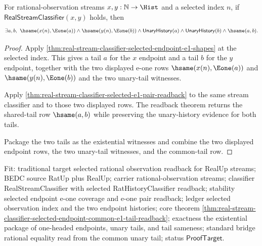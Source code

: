 \begin{theorem}
\label{thm:real-stream-classifier-selected-endpoint-common-e1-tail-readback}
For rational-observation streams $x,y:\mathbb{N}\to\Hist$ and a selected
index $n$, if $\mathsf{RealStreamClassifier}(x,y)$ holds, then
$$
\exists a,b,\ \hsame(x(n),\Eone(a))\land\hsame(y(n),\Eone(b))\land
\mathsf{UnaryHistory}(a)\land\mathsf{UnaryHistory}(b)\land\hsame(a,b).
$$
\end{theorem}
\begin{proof}
Apply \autoref{thm:real-stream-classifier-selected-endpoint-e1-shapes} at the
selected index. This gives a tail $a$ for the $x$ endpoint and a tail $b$ for the
$y$ endpoint, together with the two displayed e-one rows
$\hsame(x(n),\Eone(a))$ and $\hsame(y(n),\Eone(b))$ and the two unary-tail
witnesses.

Apply \autoref{thm:real-stream-classifier-selected-e1-pair-readback} to the same
stream classifier and to those two displayed rows. The readback theorem returns
the shared-tail row $\hsame(a,b)$ while preserving the unary-history evidence for
both tails.

Package the two tails as the existential witnesses and combine the two displayed
endpoint rows, the two unary-tail witnesses, and the common-tail row.
\end{proof}

Fit: traditional target selected rational observation readback for RealUp streams;
BEDC source RatUp plus RealUp; carrier rational-observation streams; classifier
RealStreamClassifier with selected RatHistoryClassifier readback; stability
selected endpoint e-one coverage and e-one pair readback; ledger selected
observation index and the two endpoint histories; core theorem
\autoref{thm:real-stream-classifier-selected-endpoint-common-e1-tail-readback};
exactness the existential package of one-headed endpoints, unary tails, and
tail sameness; standard bridge rational equality read from the common unary tail;
status $\mathsf{ProofTarget}$.

